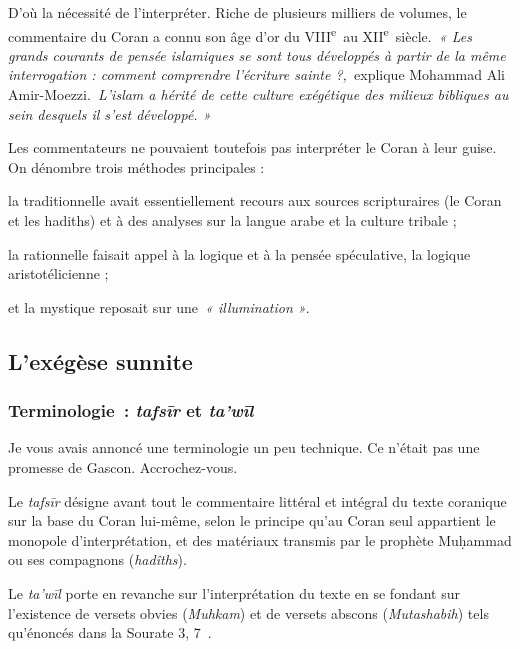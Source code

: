  
D'où la nécessité de l'interpréter. Riche de plusieurs milliers de
volumes, le commentaire du Coran a connu son âge d'or du
VIII\textsuperscript{e}~au XII\textsuperscript{e}~siècle.\emph{~« Les
grands courants de pensée islamiques se sont tous développés à partir de
la même interrogation : comment comprendre l'écriture sainte
?,~}explique Mohammad Ali Amir-Moezzi.\emph{~­L'islam a hérité de cette
culture exégétique des milieux bibliques au sein desquels il s'est
développé. »}

Les commentateurs ne pouvaient toutefois pas interpréter le Coran à leur
guise. On dénombre trois méthodes principales : 
\bi 
\item la traditionnelle avait
essentiellement recours aux sources scripturaires (le Coran et les
hadiths) et à des analyses sur la langue arabe et la culture tribale ;
\item la rationnelle faisait appel à la logique et à la pensée spéculative, la
logique aristotélicienne ; 
\item et la mystique reposait sur une~\emph{«
illumination »}.
\ei

\subsection{ L'exégèse sunnite~}


\subsubsection{{Terminologie~: \emph{tafsīr} et
\emph{ta'wīl}}}

Je vous avais annoncé une terminologie un peu technique. Ce n'était pas
une promesse de Gascon. Accrochez-vous.

\begin{Def}[tafsīr]
Le \emph{tafsīr} désigne avant tout le commentaire littéral et intégral
du texte coranique sur la base du Coran lui-même, selon le principe
qu'au Coran seul appartient le monopole d'interprétation, et des
matériaux transmis par le prophète Muḥammad ou ses compagnons
(\emph{hadîths}).
\end{Def}

\begin{Def}
Le \emph{ta'wīl} porte en revanche sur l'interprétation du texte en se
fondant sur l'existence de versets obvies (\textit{Muhkam}) et de versets abscons (\textit{Mutashabih}) tels
qu'énoncés dans la Sourate 3, 7~.
\end{Def}


